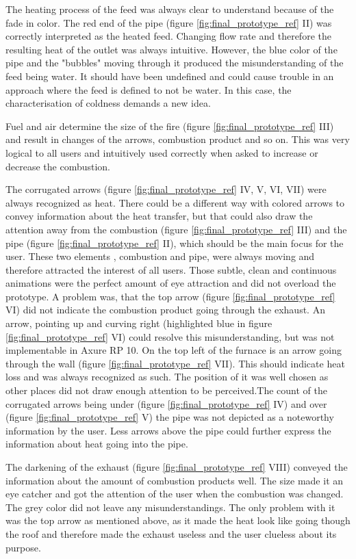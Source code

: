 The heating process of the feed was always clear to understand because of the fade in color. The red end of the pipe (figure \ref{fig:final_prototype_ref} II) was correctly interpreted as the heated feed. Changing flow rate and therefore the resulting heat of the outlet was always intuitive. However, the blue color of the pipe and the "bubbles" moving through it produced the misunderstanding of the feed being water. It should have been undefined and could cause trouble in an approach where the feed is defined to not be water. In this case, the characterisation of coldness demands a new idea. 

Fuel and air determine the size of the fire (figure \ref{fig:final_prototype_ref} III) and result in changes of the arrows, combustion product and so on. This was very logical to all users and intuitively used correctly when asked to increase or decrease the combustion.

The corrugated arrows (figure \ref{fig:final_prototype_ref} IV, V, VI, VII) were always recognized as heat. There could be a different way with colored arrows to convey information about the heat transfer, but that could also draw the attention away from the combustion (figure \ref{fig:final_prototype_ref} III) and the pipe (figure \ref{fig:final_prototype_ref} II), which should be the main focus for the user. These two elements , combustion and pipe, were always moving and therefore attracted the interest of all users. Those subtle, clean and continuous animations were the perfect amount of eye attraction and did not overload the prototype. A problem was, that the top arrow (figure \ref{fig:final_prototype_ref} VI) did not indicate the combustion product going through the exhaust. An arrow, pointing up and curving right (highlighted blue in figure \ref{fig:final_prototype_ref} VI) could resolve this misunderstanding, but was not implementable in Axure RP 10. On the top left of the furnace is an arrow going through the wall (figure \ref{fig:final_prototype_ref} VII). This should indicate heat loss and was always recognized as such. The position of it was well chosen as other places did not draw enough attention to be perceived.The count of the corrugated arrows being under (figure \ref{fig:final_prototype_ref} IV) and over (figure \ref{fig:final_prototype_ref} V) the pipe was not depicted as a noteworthy information by the user. Less arrows above the pipe could further express the information about heat going into the pipe.

The darkening of the exhaust (figure \ref{fig:final_prototype_ref} VIII) conveyed the information about the amount of combustion products well. The size made it an eye catcher and got the attention of the user when the combustion was changed. The grey color did not leave any misunderstandings. The only problem with it was the top arrow as mentioned above, as it  made the heat look like going though the roof and therefore made the exhaust useless and the user clueless about its purpose.

